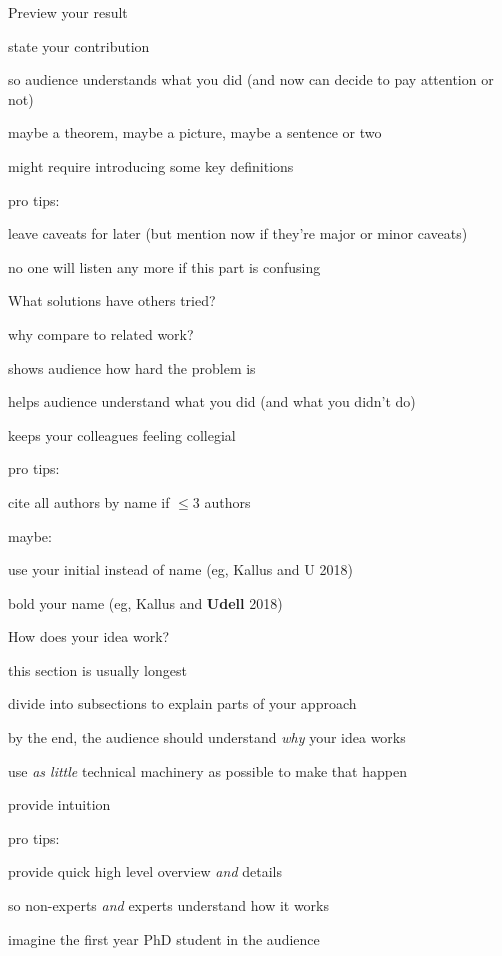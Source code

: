 \documentclass[presentation,xcolor={usenames,dvipsnames}]{beamer}
\begin{document}
\begin{frame}{Preview your result}

state your contribution
\bit
\item so audience understands what you did (and now can decide to pay attention or not)
\item maybe a theorem, maybe a picture, maybe a sentence or two
\item might require introducing some key definitions
\eit

pro tips:
\bit
\item leave caveats for later (but mention now if they're major or minor caveats)
\item no one will listen any more if this part is confusing
\eit

\end{frame}

\begin{frame}{What solutions have others tried?}

why compare to related work?
\bit
\item shows audience how hard the problem is
\item helps audience understand what you did (and what you didn't do)
\item keeps your colleagues feeling collegial
\eit

pro tips:
\bit
\item cite all authors by name if $\leq 3$ authors
\item maybe:
\bit
\item use your initial instead of name (eg, Kallus and U 2018)
\item bold your name (eg, Kallus and \textbf{Udell} 2018)
\eit
\eit

\end{frame}

\begin{frame}{How does your idea work?}

\bit
\item this section is usually longest
\item divide into subsections to explain parts of your approach
\item by the end, the audience should understand \emph{why} your idea works
\item use \emph{as little} technical machinery as possible to make that happen
\item provide intuition
\eit

pro tips:
\bit
\item provide quick high level overview \emph{and} details
\item so non-experts \emph{and} experts understand how it works
\item imagine the first year PhD student in the audience
\eit

\end{frame}
\end{document}
